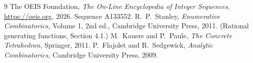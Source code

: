 \documentclass[11pt,a4paper]{article}
\theoremstyle{plain}
\theoremstyle{definition}
\begin{document}
\begin{thebibliography}{9}
 The OEIS Foundation, \emph{The On-Line Encyclopedia of Integer
Sequences}, \url{https://oeis.org}, 2026. Sequence A133552.
 R.~P.~Stanley, \emph{Enumerative Combinatorics}, Volume 1, 2nd ed.,
Cambridge University Press, 2011. (Rational generating functions, Section 4.1.)
 M.~Kauers and P.~Paule, \emph{The Concrete Tetrahedron}, Springer, 2011.
 P.~Flajolet and R.~Sedgewick, \emph{Analytic Combinatorics}, Cambridge
University Press, 2009.
\end{thebibliography}
\end{document}
